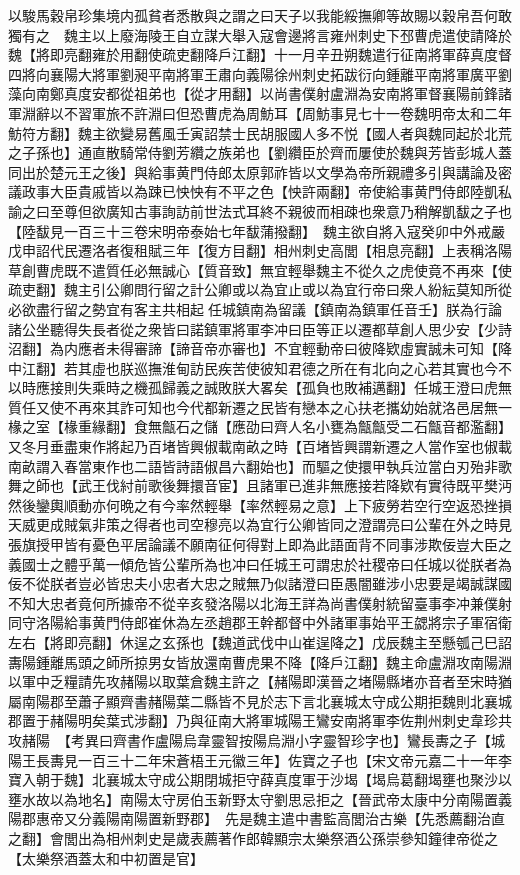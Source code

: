 以駿馬穀帛珍集境内孤貧者悉散與之謂之曰天子以我能綏撫卿等故賜以穀帛吾何敢獨有之　魏主以上廢海陵王自立謀大舉入寇會邊將言雍州刺史下邳曹虎遣使請降於魏【將即亮翻雍於用翻使疏吏翻降戶江翻】十一月辛丑朔魏遣行征南將軍薛真度督四將向襄陽大將軍劉昶平南將軍王肅向義陽徐州刺史拓跋衍向鍾離平南將軍廣平劉藻向南鄭真度安都從祖弟也【從才用翻】以尚書僕射盧淵為安南將軍督襄陽前鋒諸軍淵辭以不習軍旅不許淵曰但恐曹虎為周魴耳【周魴事見七十一卷魏明帝太和二年魴符方翻】魏主欲變易舊風壬寅詔禁士民胡服國人多不悦【國人者與魏同起於北荒之子孫也】通直散騎常侍劉芳纘之族弟也【劉纘臣於齊而屢使於魏與芳皆彭城人蓋同出於楚元王之後】與給事黄門侍郎太原郭祚皆以文學為帝所親禮多引與講論及密議政事大臣貴戚皆以為踈已怏怏有不平之色【怏許兩翻】帝使給事黄門侍郎陸凱私諭之曰至尊但欲廣知古事詢訪前世法式耳終不親彼而相疎也衆意乃稍解凱馛之子也【陸馛見一百三十三卷宋明帝泰始七年馛蒲撥翻】　魏主欲自將入寇癸卯中外戒嚴戊申詔代民遷洛者復租賦三年【復方目翻】相州刺史高閭【相息亮翻】上表稱洛陽草創曹虎既不遣質任必無誠心【質音致】無宜輕舉魏主不從久之虎使竟不再來【使疏吏翻】魏主引公卿問行留之計公卿或以為宜止或以為宜行帝曰衆人紛紜莫知所從必欲盡行留之勢宜有客主共相起任城鎮南為留議【鎮南為鎮軍任音壬】朕為行論諸公坐聽得失長者從之衆皆曰諾鎮軍將軍李冲曰臣等正以遷都草創人思少安【少詩沼翻】為内應者未得審諦【諦音帝亦審也】不宜輕動帝曰彼降欵虛實誠未可知【降中江翻】若其虛也朕巡撫淮甸訪民疾苦使彼知君德之所在有北向之心若其實也今不以時應接則失乘時之機孤歸義之誠敗朕大畧矣【孤負也敗補邁翻】任城王澄曰虎無質任又使不再來其詐可知也今代都新遷之民皆有戀本之心扶老攜幼始就洛邑居無一椽之室【椽重緣翻】食無甔石之儲【應劭曰齊人名小甕為甔甔受二石甔音都濫翻】又冬月垂盡東作將起乃百堵皆興俶載南畝之時【百堵皆興謂新遷之人當作室也俶載南畝謂入春當東作也二語皆詩語俶昌六翻始也】而驅之使擐甲執兵泣當白刃殆非歌舞之師也【武王伐紂前歌後舞擐音宦】且諸軍已進非無應接若降欵有實待既平樊沔然後鑾輿順動亦何晩之有今率然輕舉【率然輕易之意】上下疲勞若空行空返恐挫損天威更成賊氣非策之得者也司空穆亮以為宜行公卿皆同之澄謂亮曰公輩在外之時見張旗授甲皆有憂色平居論議不願南征何得對上即為此語面背不同事涉欺佞豈大臣之義國士之體乎萬一傾危皆公輩所為也冲曰任城王可謂忠於社稷帝曰任城以從朕者為佞不從朕者豈必皆忠夫小忠者大忠之賊無乃似諸澄曰臣愚闇雖涉小忠要是竭誠謀國不知大忠者竟何所據帝不從辛亥發洛陽以北海王詳為尚書僕射統留臺事李冲兼僕射同守洛陽給事黄門侍郎崔休為左丞趙郡王幹都督中外諸軍事始平王勰將宗子軍宿衛左右【將即亮翻】休逞之玄孫也【魏道武伐中山崔逞降之】戊辰魏主至懸瓠己巳詔夀陽鍾離馬頭之師所掠男女皆放還南曹虎果不降【降戶江翻】魏主命盧淵攻南陽淵以軍中乏糧請先攻赭陽以取葉倉魏主許之【赭陽即漢晉之堵陽縣堵亦音者至宋時猶屬南陽郡至蕭子顯齊書赭陽葉二縣皆不見於志下言北襄城太守成公期拒魏則北襄城郡置于赭陽明矣葉式涉翻】乃與征南大將軍城陽王鸞安南將軍李佐荆州刺史韋珍共攻赭陽　【考異曰齊書作盧陽烏韋靈智按陽烏淵小字靈智珍字也】鸞長夀之子【城陽王長夀見一百三十二年宋蒼梧王元徽三年】佐寶之子也【宋文帝元嘉二十一年李寶入朝于魏】北襄城太守成公期閉城拒守薛真度軍于沙堨【堨烏葛翻堨壅也聚沙以壅水故以為地名】南陽太守房伯玉新野太守劉思忌拒之【晉武帝太康中分南陽置義陽郡惠帝又分義陽南陽置新野郡】　先是魏主遣中書監高閭治古樂【先悉薦翻治直之翻】會閭出為相州刺史是歲表薦著作郎韓顯宗太樂祭酒公孫崇參知鐘律帝從之【太樂祭酒蓋太和中初置是官】

